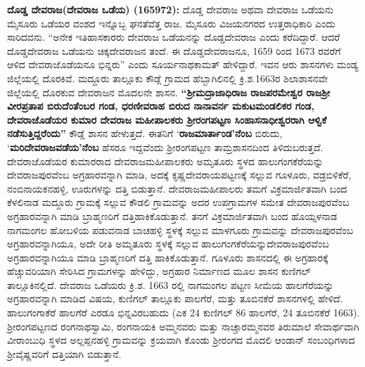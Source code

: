\textbf{ದೊಡ್ಡ ದೇವರಾಜ(ದೇವರಾಜ ಒಡೆಯ) (1659\general{\enginline{-}}72):} ದೊಡ್ಡ ದೇವರಾಜ ಅಥವಾ ದೇವರಾಜ ಒಡೆಯನು ಮೈಸೂರು ಒಡೆಯರ ವಂಶದ ಇನ್ನೊಬ್ಬ ಘನತೆವೆತ್ತ ರಾಜ. ಮೈಸೂರು ವಿಜಯನಗರದ ಉತ್ತರಾಧಿಕಾರಿ ಎಂದು ಸಾರಿದವನು. “ಅನೇಕ ಇತಿಹಾಸಕಾರರು ದೇವರಾಜ ಒಡೆಯನನ್ನು ದೊಡ್ಡದೇವರಾಜ ಎಂದು ಕರೆದಿದ್ದಾರೆ. ಆದರೆ ದೊಡ್ಡದೇವರಾಜ ಒಡೆಯನು ಚಿಕ್ಕದೇವರಾಜನ ತಂದೆ. ಈ ದೊಡ್ಡದೇವರಾಜನೂ, 1659 ರಿಂದ 1673 ರವರೆಗೆ ಆಳಿದ ದೇವರಾಜೊಡೆಯನೂ ಭಿನ್ನರು” ಎಂದು ಸೂರ್ಯನಾಥಕಾಮತ್​ ಹೇಳಿದ್ದಾರೆ. ಇವನ ಆರು ಶಾಸನಗಳು ಮಂಡ್ಯ ಜಿಲ್ಲೆಯಲ್ಲಿ ದೊರಕಿವೆ. ಮದ್ದೂರು ತಾಲ್ಲೂಕು ಕೌಡ್ಲೆ ಗ್ರಾಮದ ಹೆಬ್ಬಾಗಿಲಿನಲ್ಲಿ ಕ್ರಿ.ಶ.1663ರ ಶಿಲಾಶಾಸನವೇ ಜಿಲ್ಲೆಯಲ್ಲಿ ದೊರಕುವ ದೇವರಾಜನ ಮೊದಲನೇ ಶಾಸನ. \textbf{“ಶ‍್ರೀಮದ್ರಾಜಾಧಿರಾಜ ರಾಜಪರಮೇಶ್ವರ ರಾಜಶ‍್ರೀ ವೀರಪ್ರತಾಪ ಬಿರುದೆಂತೆಂಬರ ಗಂಡ, ಧರಣೀವರಾಹ ಬಿರುದ ನಾನಾವರ್ನ ಮಕುಟಮಂಡಲಿಕರ ಗಂಡ, ದೇವರಾಜೊಡೆಯರ ಕುಮಾರ ದೇವರಾಜ ಮಹೀಪಾಲಕರು ಶ‍್ರೀರಂಗಪಟ್ಟಣ ಸಿಂಹಾಸನಾಧೀಶ್ವರರಾಗಿ ಆಳ್ವಿಕೆ ನಡೆಸುತ್ತಿದ್ದರೆಂದು”} ಕೌಡ್ಲೆ ಶಾಸನ ಹೇಳುತ್ತದೆ. ಈತನಿಗೆ ‘\textbf{ರಾಜಮಾರ್ತಾಂಡ’ನೆಂಬ} ಬಿರುದು, ‘\textbf{ಮರಿದೇವರಾಜವಡೆಯ’ನೆಂಬ} ಹೆಸರೂ ಇದ್ದವೆಂದು ಶ‍್ರೀರಂಗಪಟ್ಟಣ ತಾಮ್ರಶಾಸನದಿಂದ ತಿಳಿದುಬರುತ್ತದೆ. ದೇವರಾಜೊಡೆಯರ ಕುಮಾರರಾದ ದೇವರಾಜಮಹೀಪಾಲಕರು ಅಮೃತೂರು ಸ್ಥಳದ ಹಾಲುಗಂಗಕೆರೆಯನ್ನು ದೇವರಾಜಪುರವೆಂಬ ಅಗ್ರಹಾರವನ್ನಾಗಿ ಮಾಡಿ, ಅದಕ್ಕೆ ಕೃಷ್ಣದೇವರಾಯಪಟ್ಟಣಕ್ಕೆ ಸಲ್ಲುವ ಗೂಳೂರು, ವಡ್ರಬಿಳಿಕೆರೆ, ನಂಬಿನಾಯಕನಹಳ್ಳಿ, ಊರುಗಳನ್ನು ದತ್ತಿ ಬಿಡುತ್ತಾನೆ. ದೇವರಾಜಮಹೀಪಾಲರು ತಮಗೆ ವಿಕ್ರಮಾರ್ಜಿತವಾಗಿ ಬಂದ ಕೆಳಲಿನಾಡ ಮದ್ದೂರು ಗ್ರಾಮಕ್ಕೆ ಸಲ್ಲುವ ಕೌಡಲಿ ಗ್ರಾಮವನ್ನು ಅದರ ಉಪಗ್ರಾಮಗಳ ಸಮೇತ ದೇವರಾಜಪುರವೆಂಬ ಅಗ್ರಹಾರವನ್ನಾಗಿ ಮಾಡಿ ಬ್ರಾಹ್ಮಣರಿಗೆ ದತ್ತಿಹಾಕಿಕೊಡುತ್ತಾನೆ. ತನಗೆ ವಿಕ್ರಮಾರ್ಜಿತವಾಗಿ ಬಂದ ಹೊಯ್ಸಳನಾಡ ನಾಗಮಂಗಲ ಹೋಬಳಿಯ ಪಡುವನಾಡ ಬಾಚಹಳ್ಳಿ ಸ್ಥಳಕ್ಕೆ ಸಲ್ಲುವ ಮಾಳಗೂರು ಗ್ರಾಮವನ್ನು ದೇವರಾಜಪುರವೆಂಬ ಅಗ್ರಹಾರವನ್ನಾಗಿಯೂ, ಅದೇ ರೀತಿ ಅಮೃತೂರು ಸ್ಥಳಕ್ಕೆ ಸಲ್ಲುವ ಹಾಲುಗಂಗಕೆರೆಯನ್ನು\break ದೇವರಾಜಪುರವೆಂಬ ಅಗ್ರಹಾರವನ್ನಾಗಿಯೂ ಮಾಡಿ ಬ್ರಾಹ್ಮಣರಿಗೆ ದತ್ತಿ ಹಾಕಿಕೊಡುತ್ತಾನೆ. ಗೂಳೂರು ಶಾಸನದಲ್ಲಿ ಈ ಅಗ್ರಹಾರಕ್ಕೆ ಹೆಚ್ಚುವರಿಯಾಗಿ ಸೇರಿಸಿದ ಗ್ರಾಮಗಳನ್ನು ಹೇಳಿದ್ದು, ಅಗ್ರಹಾರ ನಿರ್ಮಾಣದ ಮೂಲ ಶಾಸನ ಕುಣಿಗಲ್​ ತಾಲ್ಲೂಕಿನಲ್ಲಿದೆ. ದೇವರಾಜ ಒಡೆಯರು ಕ್ರಿ.ಶ. 1663 ರಲ್ಲಿ ನಾಗಮಂಗಲ ಪಟ್ಟಣ ಸೀಮೆಯ ಹಾಲಗೆರೆಯನ್ನು ಅಗ್ರಹಾರವನ್ನಾಗಿ ಮಾಡಿದ ವಿಷಯ, ಕುಣಿಗಲ್ ತಾಲ್ಲೂಕು ಪಾಲಗೆರೆ, ಮತ್ತು ತೂಬಿನಕೆರೆ ಶಾಸನಗಳಲ್ಲಿ ಹೇಳಿದೆ. ಹಾಲುಗಂಗಾಕೆರೆ ಹಾಲಗೆರೆ ಎರಡೂ ಭಿನ್ನವಿರಬಹುದು (ಎಕ 24 ಕುಣಿಗಲ್ 86 ಹಾಲಗೆರೆ, 24 ತೂಬಿನಕೆರೆ 1663). ಶ‍್ರೀರಂಗಪಟ್ಟಣದ ರಂಗನಾಥಸ್ವಾಮಿ, ರಂಗನಾಯಕಿ ಅಮ್ಮನವರು ಮತ್ತು ನಾಚ್ಚಾರಮ್ಮನವರ ತಿರುಮಾಲೆ ಸೇವಾರ್ಥವಾಗಿ ವೀರಾಂಬುಧಿ ಸ್ಥಳದ ಅಲ್ಲಪ್ಪನಹಳ್ಳಿ ಗ್ರಾಮವನ್ನು ಕ್ರಯವಾಗಿ ಕೊಂಡು ಶ‍್ರೀರಂಗದ ಮೊದಲಿ ಆಂಡಾನ್​ ಸಂಬಂಧಿಗಳಾದ ಶ‍್ರೀವೈಷ್ಣವರಿಗೆ ದತ್ತಿಯಾಗಿ ಬಿಡುತ್ತಾನೆ.

